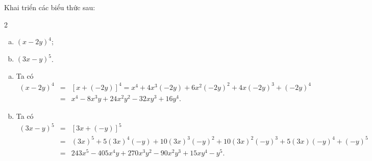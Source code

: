 \begin{vd}%
	Khai triển các biểu thức sau:
	\begin{multicols}{2}
		\begin{enumerate}[a)]
			\item $(x-2y)^4$;
			\item $(3x-y)^5$.
		\end{enumerate}
	\end{multicols}
	\loigiai
	{\begin{enumerate}[a)]
			\item Ta có
			\begin{eqnarray*}
				(x-2y)^4&=&[x+(-2y)]^4=x^4+4x^3(-2y)+6x^2(-2y)^2+4x(-2y)^3+(-2y)^4\\
				&=&x^4-8x^3y+24x^2y^2-32xy^3+16y^4.
			\end{eqnarray*}
			\item Ta có
			\begin{eqnarray*}
				(3x-y)^5&=&[3x+(-y)]^5\\
				&=&(3x)^5+5(3x)^4(-y)+10(3x)^3(-y)^2+10(3x)^2(-y)^3+5(3x)(-y)^4+(-y)^5\\
				&=&243x^5-405x^4y+270x^3y^2-90x^2y^3+15xy^4-y^5.
			\end{eqnarray*}
		\end{enumerate}
	}
\end{vd}

